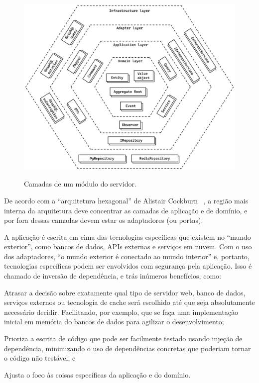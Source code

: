 \begin{figure}[htbp]
	\caption{\small Camadas de um módulo do servidor.}
	\centering
	\includegraphics[width=\textwidth]{../diagrams/out/system_server_each-module_layers.png}
	\label{f.system_server_each-module_layers}
\end{figure}

\FloatBarrier

De acordo com a ``arquitetura hexagonal'' de Alistair Cockburn ~\cite{hexagonal-architecture}, a região mais interna da arquitetura deve concentrar as camadas de aplicação e de domínio, e por fora dessas camadas devem estar os adaptadores (ou portas). 

A aplicação é escrita em cima das tecnologias específicas que existem no ``mundo exterior'', como bancos de dados, APIs externas e serviços em nuvem. Com o uso dos adaptadores, ``o mundo exterior é conectado ao mundo interior'' e, portanto, tecnologias específicas podem ser envolvidos com segurança pela aplicação. Isso é chamado de inversão de dependência, e trás inúmeros benefícios, como: 

\begin{alineas}
	\item Atrasar a decisão sobre exatamente qual tipo de servidor web, banco de dados, serviços externos ou tecnologia de cache será escolhido até que seja absolutamente necessário decidir. Facilitando, por exemplo, que se faça uma implementação inicial em memória do bancos de dados para agilizar o desenvolvimento;
	\item Prioriza a escrita de código que pode ser facilmente testado usando injeção de dependência, minimizando o uso de dependências concretas que poderiam tornar o código não testável; e
	\item Ajusta o foco às coisas específicas da aplicação e do domínio.
\end{alineas}

